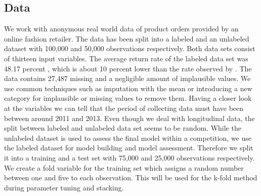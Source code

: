 \documentclass[12pt]{article}
\begin{document}
\subsection{Data}
We work with anonymous real world data of product orders provided by an online fashion retailer. The data has been split into a labeled and an unlabeled dataset with 100,000 and 50,000 observations respectively. Both data sets consist of thirteen input variables. The average return rate of the labeled data set was 48.17 percent , which is about 10 percent lower than the rate observed by  \cite{urbanke2015predicting} . The data contains 27,487 missing and a negligible amount of implausible values. We use common techniques such as imputation with the mean or introducing a new category for implausible or missing values to remove them. Having a closer look at the variables we can tell that the period of collecting data must have been between around 2011 and 2013. Even though we deal with longitudinal data, the split between labeled and unlabeled data set seems to be random. While the unlabeled dataset is used to assess the final model within a competition, we use the labeled dataset for model building and model assessment. Therefore we split it into a training and a test set with 75,000 and 25,000 observations respectively. We create a fold variable for the training set which assigns a random number between one and five to each observation. This will be used for the k-fold method during parameter tuning and stacking.
\end{document}
